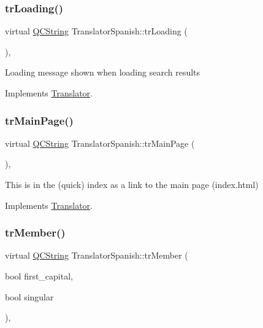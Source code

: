\subsubsection{\texorpdfstring{trLoading()}{trLoading()}}
{\footnotesize\ttfamily virtual \mbox{\hyperlink{class_q_c_string}{Q\+C\+String}} Translator\+Spanish\+::tr\+Loading (\begin{DoxyParamCaption}{ }\end{DoxyParamCaption})\hspace{0.3cm}{\ttfamily [inline]}, {\ttfamily [virtual]}}

Loading message shown when loading search results 

Implements \mbox{\hyperlink{class_translator}{Translator}}.

\mbox{\label{class_translator_spanish_a47f4e10a7c54811e632d3e618b4db203}} 
\subsubsection{\texorpdfstring{trMainPage()}{trMainPage()}}
{\footnotesize\ttfamily virtual \mbox{\hyperlink{class_q_c_string}{Q\+C\+String}} Translator\+Spanish\+::tr\+Main\+Page (\begin{DoxyParamCaption}{ }\end{DoxyParamCaption})\hspace{0.3cm}{\ttfamily [inline]}, {\ttfamily [virtual]}}

This is in the (quick) index as a link to the main page (index.\+html) 

Implements \mbox{\hyperlink{class_translator}{Translator}}.

\mbox{\label{class_translator_spanish_aaf8244d61d6113b129bd1c20bc6fb9e1}} 
\subsubsection{\texorpdfstring{trMember()}{trMember()}}
{\footnotesize\ttfamily virtual \mbox{\hyperlink{class_q_c_string}{Q\+C\+String}} Translator\+Spanish\+::tr\+Member (\begin{DoxyParamCaption}\item[{bool}]{first\+\_\+capital,  }\item[{bool}]{singular }\end{DoxyParamCaption})\hspace{0.3cm}{\ttfamily [inline]}, {\ttfamily [virtual]}}


